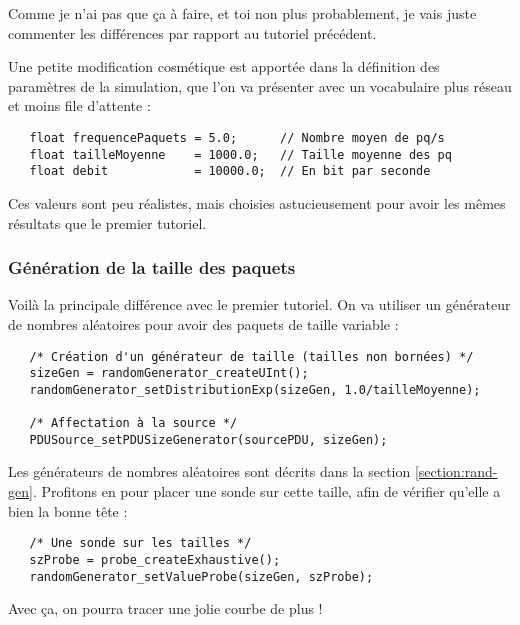 \documentclass{article}
\begin{document}
   Comme je n'ai pas que ça à faire, et toi non plus probablement, je
vais juste commenter les différences par rapport au tutoriel
précédent.

   Une petite modification cosmétique est apportée dans la définition
des paramètres de la simulation, que l'on va présenter avec un
vocabulaire plus réseau et moins file d'attente :

\begin{verbatim}
   float frequencePaquets = 5.0;      // Nombre moyen de pq/s
   float tailleMoyenne    = 1000.0;   // Taille moyenne des pq
   float debit            = 10000.0;  // En bit par seconde
\end{verbatim}

   Ces valeurs sont peu réalistes, mais choisies astucieusement pour
avoir les mêmes résultats que le premier tutoriel.

%
\subsubsection{Génération de la taille des paquets}

   Voilà la principale différence avec le premier tutoriel. On va
utiliser un générateur de nombres aléatoires pour avoir des paquets de
taille variable :

\begin{verbatim}
   /* Création d'un générateur de taille (tailles non bornées) */
   sizeGen = randomGenerator_createUInt();
   randomGenerator_setDistributionExp(sizeGen, 1.0/tailleMoyenne);

   /* Affectation à la source */
   PDUSource_setPDUSizeGenerator(sourcePDU, sizeGen);
\end{verbatim}

  Les générateurs de nombres aléatoires sont décrits dans la section
\ref{section:rand-gen}. Profitons en pour placer une sonde sur cette
taille, afin de vérifier qu'elle a bien la bonne tête :

\begin{verbatim}
   /* Une sonde sur les tailles */
   szProbe = probe_createExhaustive();
   randomGenerator_setValueProbe(sizeGen, szProbe);
\end{verbatim}

   Avec ça, on pourra tracer une jolie courbe de plus !

%
\end{document}
